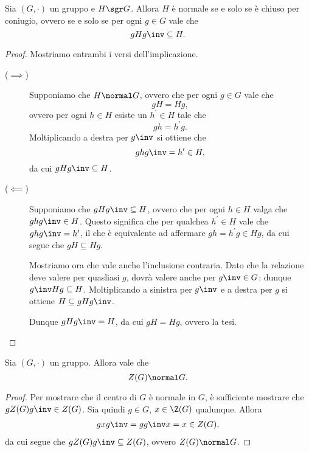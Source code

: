 \begin{proposition} \label{prop:normale_sse_chiuso_per_coniugio}
    Sia $(G, \cdot)$ un gruppo e $H \sgr G$.
    Allora $H$ è normale se e solo se è chiuso per coniugio, ovvero se e solo se per ogni $g \in G$ vale che \[
        gHg\inv \subseteq H.    
    \]
\end{proposition}
\begin{proof}
    Mostriamo entrambi i versi dell'implicazione.
    \begin{description}
        \item[($\implies$)] Supponiamo che $H \normal G$, ovvero che per ogni $g \in G$ vale che \[
            gH = Hg,
        \] ovvero per ogni $h \in H$ esiste un $h^\prime \in H$ tale che \[
            gh = h^\prime g.    
        \] Moltiplicando a destra per $g\inv$ si ottiene che \[
            ghg\inv = h^\prime \in H,   
        \] da cui $gHg\inv \subseteq H$.
        \item[($\impliedby$)] Supponiamo che $gHg\inv \subseteq H$, ovvero che per ogni $h \in H$ valga che $ghg\inv \in H$.
            Questo significa che per qualchea $h^\prime \in H$ vale che $ghg\inv = h^\prime$, 
            il che è equivalente ad affermare $gh = h^\prime g \in Hg$, da cui segue che $gH \subseteq Hg$.

            Mostriamo ora che vale anche l'inclusione contraria.
            Dato che la relazione deve valere per quasliasi $g$, dovrà valere anche per $g\inv \in G$: dunque $g\inv Hg \subseteq H$.
            Moltiplicando a sinistra per $g\inv$ e a destra per $g$ si ottiene $H \subseteq gHg\inv$.

            Dunque $gHg\inv = H$, da cui $gH = Hg$, ovvero la tesi. \qedhere
    \end{description}
\end{proof}

\begin{proposition}
    \label{prop:centro_normale}
    Sia $(G, \cdot)$ un gruppo. Allora vale che \[
        Z(G) \normal G.    
    \]
\end{proposition}
\begin{proof}
    Per mostrare che il centro di $G$ è normale in $G$, è sufficiente mostrare che $gZ(G)g\inv \in Z(G)$.
    Sia quindi $g \in G$, $x \in \Z(G)$ qualunque. Allora
    \begin{align*}
        gxg\inv = gg\inv x = x \in Z(G),    
    \end{align*} da cui segue che $gZ(G)g\inv \subseteq Z(G)$, ovvero $Z(G) \normal G$.
\end{proof}

